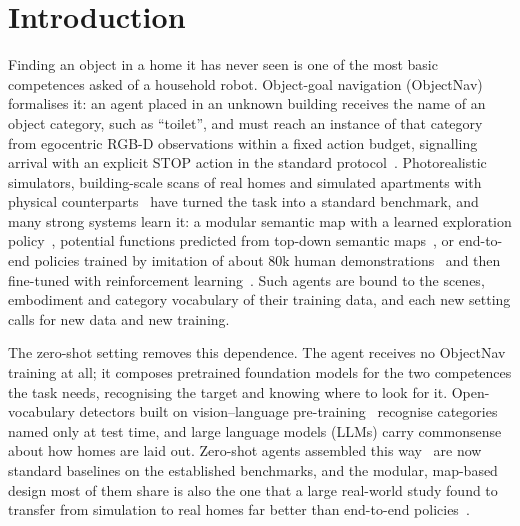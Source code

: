\documentclass[10pt]{article}
\begin{document}
\section{Introduction}\label{sec:intro}

Finding an object in a home it has never seen is one of the most basic competences asked of a household robot.
Object-goal navigation (ObjectNav) formalises it: an agent placed in an unknown building receives the name of an
object category, such as ``toilet'', and must reach an instance of that category from egocentric RGB-D
observations within a fixed action budget, signalling arrival with an explicit STOP action in the standard
protocol~\citep{batra2020objectnav}. Photorealistic simulators, building-scale scans of real homes and simulated
apartments with physical
counterparts~\citep{savva2019habitat,xia2018gibson,chang2017matterport3d,ramakrishnan2021habitat,deitke2020robothor}
have turned the task into a standard benchmark, and many strong systems learn it: a modular semantic map with a
learned exploration policy~\citep{chaplot2020object}, potential functions predicted from top-down semantic
maps~\citep{ramakrishnan2022poni}, or end-to-end policies trained by imitation of about 80k human
demonstrations~\citep{ramrakhya2022habitat} and then fine-tuned with reinforcement
learning~\citep{ramrakhya2023pirlnav}. Such agents are bound to the scenes,
embodiment and category vocabulary of their training data, and each new setting calls for new data and new
training.

The zero-shot setting removes this dependence. The agent receives no ObjectNav training at all; it composes
pretrained foundation models for the two competences the task needs, recognising the target and knowing where to
look for it. Open-vocabulary detectors built on vision--language
pre-training~\citep{radford2021learning,cheng2024yolo} recognise categories named only at test time, and large
language models (LLMs) carry commonsense about how homes are laid out. Zero-shot agents assembled this
way~\citep{gadre2023cows,zhou2023esc,yu2023l3mvn,yokoyama2024vlfm,yin2024sg,zhang2025apexnav} are now standard
baselines on the established benchmarks, and the modular, map-based design most of them share is also the one
that a large real-world study found to transfer from simulation to real homes far better than end-to-end
policies~\citep{gervet2023navigating}.
\end{document}
